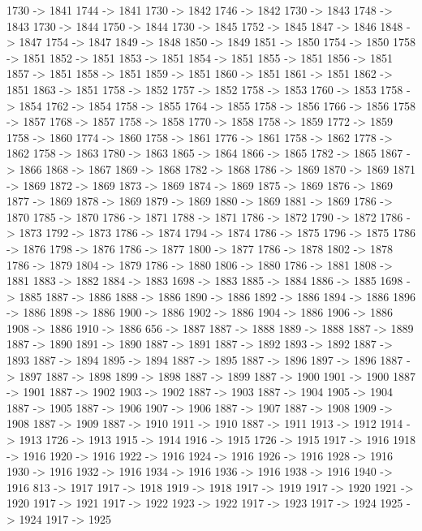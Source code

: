 {	1730 -> 1841
	1744 -> 1841
	1730 -> 1842
	1746 -> 1842
	1730 -> 1843
	1748 -> 1843
	1730 -> 1844
	1750 -> 1844
	1730 -> 1845
	1752 -> 1845
	1847 -> 1846
	1848 -> 1847
	1754 -> 1847
	1849 -> 1848
	1850 -> 1849
	1851 -> 1850
	1754 -> 1850
	1758 -> 1851
	1852 -> 1851
	1853 -> 1851
	1854 -> 1851
	1855 -> 1851
	1856 -> 1851
	1857 -> 1851
	1858 -> 1851
	1859 -> 1851
	1860 -> 1851
	1861 -> 1851
	1862 -> 1851
	1863 -> 1851
	1758 -> 1852
	1757 -> 1852
	1758 -> 1853
	1760 -> 1853
	1758 -> 1854
	1762 -> 1854
	1758 -> 1855
	1764 -> 1855
	1758 -> 1856
	1766 -> 1856
	1758 -> 1857
	1768 -> 1857
	1758 -> 1858
	1770 -> 1858
	1758 -> 1859
	1772 -> 1859
	1758 -> 1860
	1774 -> 1860
	1758 -> 1861
	1776 -> 1861
	1758 -> 1862
	1778 -> 1862
	1758 -> 1863
	1780 -> 1863
	1865 -> 1864
	1866 -> 1865
	1782 -> 1865
	1867 -> 1866
	1868 -> 1867
	1869 -> 1868
	1782 -> 1868
	1786 -> 1869
	1870 -> 1869
	1871 -> 1869
	1872 -> 1869
	1873 -> 1869
	1874 -> 1869
	1875 -> 1869
	1876 -> 1869
	1877 -> 1869
	1878 -> 1869
	1879 -> 1869
	1880 -> 1869
	1881 -> 1869
	1786 -> 1870
	1785 -> 1870
	1786 -> 1871
	1788 -> 1871
	1786 -> 1872
	1790 -> 1872
	1786 -> 1873
	1792 -> 1873
	1786 -> 1874
	1794 -> 1874
	1786 -> 1875
	1796 -> 1875
	1786 -> 1876
	1798 -> 1876
	1786 -> 1877
	1800 -> 1877
	1786 -> 1878
	1802 -> 1878
	1786 -> 1879
	1804 -> 1879
	1786 -> 1880
	1806 -> 1880
	1786 -> 1881
	1808 -> 1881
	1883 -> 1882
	1884 -> 1883
	1698 -> 1883
	1885 -> 1884
	1886 -> 1885
	1698 -> 1885
	1887 -> 1886
	1888 -> 1886
	1890 -> 1886
	1892 -> 1886
	1894 -> 1886
	1896 -> 1886
	1898 -> 1886
	1900 -> 1886
	1902 -> 1886
	1904 -> 1886
	1906 -> 1886
	1908 -> 1886
	1910 -> 1886
	656 -> 1887
	1887 -> 1888
	1889 -> 1888
	1887 -> 1889
	1887 -> 1890
	1891 -> 1890
	1887 -> 1891
	1887 -> 1892
	1893 -> 1892
	1887 -> 1893
	1887 -> 1894
	1895 -> 1894
	1887 -> 1895
	1887 -> 1896
	1897 -> 1896
	1887 -> 1897
	1887 -> 1898
	1899 -> 1898
	1887 -> 1899
	1887 -> 1900
	1901 -> 1900
	1887 -> 1901
	1887 -> 1902
	1903 -> 1902
	1887 -> 1903
	1887 -> 1904
	1905 -> 1904
	1887 -> 1905
	1887 -> 1906
	1907 -> 1906
	1887 -> 1907
	1887 -> 1908
	1909 -> 1908
	1887 -> 1909
	1887 -> 1910
	1911 -> 1910
	1887 -> 1911
	1913 -> 1912
	1914 -> 1913
	1726 -> 1913
	1915 -> 1914
	1916 -> 1915
	1726 -> 1915
	1917 -> 1916
	1918 -> 1916
	1920 -> 1916
	1922 -> 1916
	1924 -> 1916
	1926 -> 1916
	1928 -> 1916
	1930 -> 1916
	1932 -> 1916
	1934 -> 1916
	1936 -> 1916
	1938 -> 1916
	1940 -> 1916
	813 -> 1917
	1917 -> 1918
	1919 -> 1918
	1917 -> 1919
	1917 -> 1920
	1921 -> 1920
	1917 -> 1921
	1917 -> 1922
	1923 -> 1922
	1917 -> 1923
	1917 -> 1924
	1925 -> 1924
	1917 -> 1925
}
